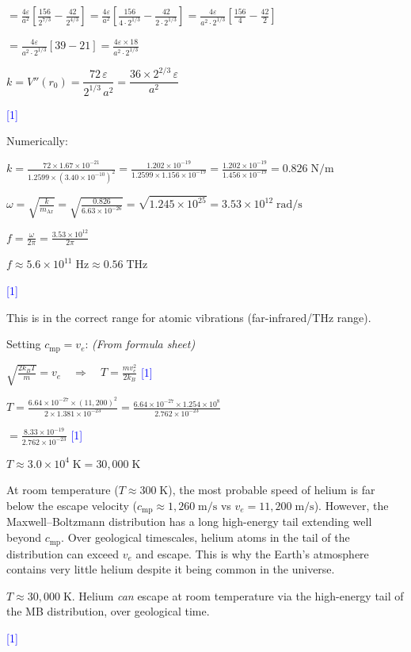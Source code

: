 \documentclass[12pt,a4paper]{article}
\newcommand{\markstep}[1]{\hfill\textcolor{blue}{[#1]}}
\newcommand{\finalanswer}[1]{%
  \begin{tcolorbox}[colback=green!5!white,colframe=green!50!black,boxrule=0.5pt]
  #1
  \end{tcolorbox}
}
\newcommand{\fromsheet}{\textit{(From formula sheet)}}
\begin{document}
\begin{parts}
$= \frac{4\varepsilon}{a^2}\!\left[\frac{156}{2^{7/3}} - \frac{42}{2^{4/3}}\right] = \frac{4\varepsilon}{a^2}\!\left[\frac{156}{4\cdot 2^{1/3}} - \frac{42}{2\cdot 2^{1/3}}\right] = \frac{4\varepsilon}{a^2\cdot 2^{1/3}}\!\left[\frac{156}{4} - \frac{42}{2}\right]$

$= \frac{4\varepsilon}{a^2\cdot 2^{1/3}}\!\left[39 - 21\right] = \frac{4\varepsilon\times 18}{a^2\cdot 2^{1/3}}$

\finalanswer{$k = V''(r_0) = \dfrac{72\,\varepsilon}{2^{1/3}\,a^2} = \dfrac{36\times 2^{2/3}\,\varepsilon}{a^2}$} \markstep{1}

Numerically:

$k = \frac{72\times 1.67\times 10^{-21}}{1.2599\times(3.40\times 10^{-10})^2} = \frac{1.202\times 10^{-19}}{1.2599\times 1.156\times 10^{-19}} = \frac{1.202\times 10^{-19}}{1.456\times 10^{-19}} = 0.826\;\text{N/m}$

$\omega = \sqrt{\frac{k}{m_\text{Ar}}} = \sqrt{\frac{0.826}{6.63\times 10^{-26}}} = \sqrt{1.245\times 10^{25}} = 3.53\times 10^{12}\;\text{rad/s}$

$f = \frac{\omega}{2\pi} = \frac{3.53\times 10^{12}}{2\pi}$

\finalanswer{$f \approx 5.6\times 10^{11}\;\text{Hz} \approx 0.56\;\text{THz}$} \markstep{1}

This is in the correct range for atomic vibrations (far-infrared/THz range).

\item

Setting $c_\text{mp} = v_e$: \fromsheet

$\sqrt{\frac{2k_BT}{m}} = v_e \quad\Longrightarrow\quad T = \frac{m v_e^2}{2k_B}$ \markstep{1}

$T = \frac{6.64\times 10^{-27}\times (11{,}200)^2}{2\times 1.381\times 10^{-23}} = \frac{6.64\times 10^{-27}\times 1.254\times 10^{8}}{2.762\times 10^{-23}}$

$= \frac{8.33\times 10^{-19}}{2.762\times 10^{-23}}$ \markstep{1}

\finalanswer{$T \approx 3.0\times 10^{4}\;\text{K} = 30{,}000\;\text{K}$}

At room temperature ($T \approx 300\;\text{K}$), the most probable speed of helium is far below the escape velocity ($c_\text{mp} \approx 1{,}260\;\text{m/s}$ vs $v_e = 11{,}200\;\text{m/s}$). However, the Maxwell--Boltzmann distribution has a long high-energy tail extending well beyond $c_\text{mp}$. Over geological timescales, helium atoms in the tail of the distribution can exceed $v_e$ and escape. This is why the Earth's atmosphere contains very little helium despite it being common in the universe.

\finalanswer{$T \approx 30{,}000\;\text{K}$. Helium \emph{can} escape at room temperature via the high-energy tail of the MB distribution, over geological time.} \markstep{1}

\end{parts}
\end{document}
